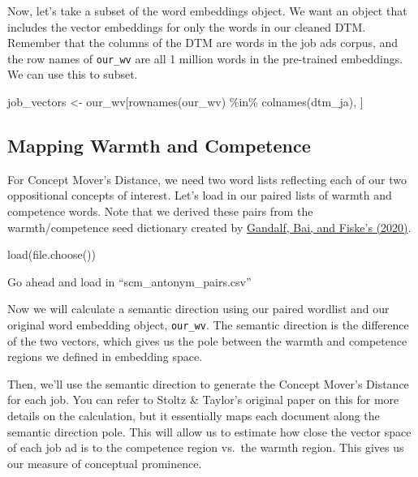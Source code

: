 \documentclass[
  letterpaper,
  DIV=11,
  numbers=noendperiod]{scrreprt}
\newenvironment{Shaded}{\begin{snugshade}}{\end{snugshade}}
\newcommand{\FunctionTok}[1]{\textcolor[rgb]{0.28,0.35,0.67}{#1}}
\newcommand{\NormalTok}[1]{\textcolor[rgb]{0.00,0.23,0.31}{#1}}
\newcommand{\OtherTok}[1]{\textcolor[rgb]{0.00,0.23,0.31}{#1}}
\newcommand{\SpecialCharTok}[1]{\textcolor[rgb]{0.37,0.37,0.37}{#1}}
\begin{document}
Now, let's take a subset of the word embeddings object. We want an
object that includes the vector embeddings for only the words in our
cleaned DTM. Remember that the columns of the DTM are words in the job
ads corpus, and the row names of \texttt{our\_wv} are all 1 million
words in the pre-trained embeddings. We can use this to subset.

\begin{Shaded}
\begin{Highlighting}[]
\NormalTok{job\_vectors }\OtherTok{\textless{}{-}}\NormalTok{ our\_wv[}\FunctionTok{rownames}\NormalTok{(our\_wv) }\SpecialCharTok{\%in\%} \FunctionTok{colnames}\NormalTok{(dtm\_ja), ]}
\end{Highlighting}
\end{Shaded}

\subsection{Mapping Warmth and
Competence}\label{mapping-warmth-and-competence}

For Concept Mover's Distance, we need two word lists reflecting each of
our two oppositional concepts of interest. Let's load in our paired
lists of warmth and competence words. Note that we derived these pairs
from the warmth/competence seed dictionary created by
\href{https://onlinelibrary.wiley.com/doi/full/10.1002/ejsp.2724?casa_token=gqMHBVmq7eUAAAAA\%3Azr6pilqgfE2nbpJ6yt1aikGXx4GZnenVpTp3F6g9kEPglQqBvFedzgMtbFPuH0mVQ1JUUkzgitZeR6M}{Gandalf,
Bai, and Fiske's (2020)}.

\begin{Shaded}
\begin{Highlighting}[]
\FunctionTok{load}\NormalTok{(}\FunctionTok{file.choose}\NormalTok{())}
\end{Highlighting}
\end{Shaded}

Go ahead and load in ``scm\_antonym\_pairs.csv''

Now we will calculate a semantic direction using our paired wordlist and
our original word embedding object, \texttt{our\_wv}. The semantic
direction is the difference of the two vectors, which gives us the pole
between the warmth and competence regions we defined in embedding space.

Then, we'll use the semantic direction to generate the Concept Mover's
Distance for each job. You can refer to Stoltz \& Taylor's original
paper on this for more details on the calculation, but it essentially
maps each document along the semantic direction pole. This will allow us
to estimate how close the vector space of each job ad is to the
competence region vs.~the warmth region. This gives us our measure of
conceptual prominence.
\end{document}
